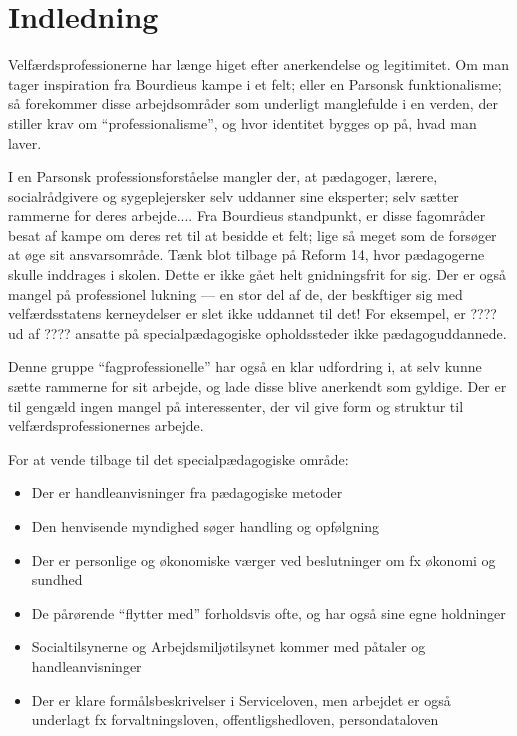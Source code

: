 \section{Indledning}

Velfærdsprofessionerne har længe higet efter anerkendelse og legitimitet.
Om man tager inspiration fra Bourdieus kampe i et felt; eller en Parsonsk funktionalisme; så forekommer disse arbejdsområder som underligt manglefulde i en verden, der stiller krav om “professionalisme”, og hvor identitet bygges op på, hvad man laver.

I en Parsonsk professionsforståelse mangler der, at pædagoger, lærere, socialrådgivere og sygeplejersker selv uddanner sine eksperter; selv sætter rammerne for deres arbejde....
Fra Bourdieus standpunkt, er disse fagområder besat af kampe om deres ret til at besidde et felt; lige så meget som de forsøger at øge sit ansvarsområde.
Tænk blot tilbage på Reform 14, hvor pædagogerne skulle inddrages i skolen.
Dette er ikke gået helt gnidningsfrit for sig.
Der er også mangel på professionel lukning — en stor del af de, der beskftiger sig med velfærdsstatens kerneydelser er slet ikke uddannet til det! For eksempel, er ???? ud af ???? ansatte på specialpædagogiske opholdssteder ikke pædagoguddannede.

Denne gruppe “fagprofessionelle” har også en klar udfordring i, at selv kunne sætte rammerne for sit arbejde, og lade disse blive anerkendt som gyldige.
Der er til gengæld ingen mangel på interessenter, der vil give form og struktur til velfærdsprofessionernes arbejde.

For at vende tilbage til det specialpædagogiske område:
\begin{itemize}
  \item
    Der er handleanvisninger fra pædagogiske metoder
  \item
    Den henvisende myndighed søger handling og opfølgning
  \item
    Der er personlige og økonomiske værger ved beslutninger om fx økonomi og sundhed
  \item
    De pårørende “flytter med” forholdsvis ofte, og har også sine egne holdninger
  \item
    Socialtilsynerne og Arbejdsmiljøtilsynet kommer med påtaler og handleanvisninger
  \item
    Der er klare formålsbeskrivelser i Serviceloven, men arbejdet er også underlagt fx forvaltningsloven, offentligshedloven, persondataloven
\end{itemize}

